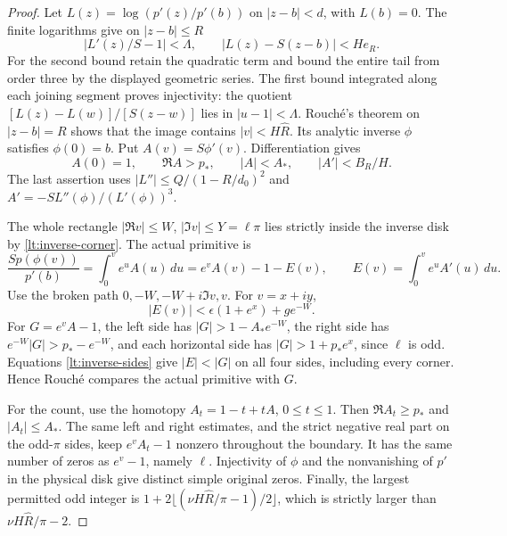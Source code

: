 \begin{proof}
Let $L(z)=\log(p'(z)/p'(b))$ on $|z-b|<d$, with $L(b)=0$.
The finite logarithms give on $|z-b|\le R$
\[
 |L'(z)/S-1|<\Lambda,\qquad
 |L(z)-S(z-b)|<He_R.
\]
For the second bound retain the quadratic term and bound the entire
tail from order three by the displayed geometric series. The first
bound integrated along each joining segment proves injectivity: the
quotient $[L(z)-L(w)]/[S(z-w)]$ lies in $|u-1|<\Lambda$.
Rouch\'e's theorem on $|z-b|=R$ shows that the image contains
$|v|<H\widehat R$. Its analytic inverse $\phi$ satisfies
$\phi(0)=b$. Put $A(v)=S\phi'(v)$. Differentiation gives
\[
 A(0)=1,\qquad \Re A>p_*,\qquad |A|<A_*,\qquad |A'|<B_R/H.
\]
The last assertion uses
$|L''|\le Q/(1-R/d_0)^2$ and
$A'=-S L''(\phi)/(L'(\phi))^3$.

The whole rectangle $|\Re v|\le W$, $|\Im v|\le Y=\ell\pi$
lies strictly inside the inverse disk by \eqref{lt:inverse-corner}.
The actual primitive is
\[
 \frac{Sp(\phi(v))}{p'(b)}
  =\int_0^ve^uA(u)\,du=e^vA(v)-1-E(v),\qquad
 E(v)=\int_0^ve^uA'(u)\,du.
\]
Use the broken path $0,-W,-W+i\Im v,v$. For $v=x+iy$,
\[
 |E(v)|<\epsilon(1+e^x)+ge^{-W}.
\]
For $G=e^vA-1$, the left side has $|G|>1-A_*e^{-W}$,
the right side has $e^{-W}|G|>p_*-e^{-W}$, and each horizontal
side has $|G|>1+p_*e^x$, since $\ell$ is odd. Equations
\eqref{lt:inverse-sides} give $|E|<|G|$ on all four sides,
including every corner. Hence Rouch\'e compares the actual
primitive with $G$.

For the count, use the homotopy $A_t=1-t+tA$,
$0\le t\le1$. Then $\Re A_t\ge p_*$ and $|A_t|\le A_*$.
The same left and right estimates, and the strict negative real part
on the odd-$\pi$ sides, keep $e^vA_t-1$ nonzero throughout the
boundary. It has the same number of zeros as $e^v-1$, namely
$\ell$. Injectivity of $\phi$ and the nonvanishing of $p'$ in
the physical disk give distinct simple original zeros.
Finally, the largest permitted odd integer is
$1+2\lfloor(\nu H\widehat R/\pi-1)/2\rfloor$, which is
strictly larger than $\nu H\widehat R/\pi-2$.
\end{proof}

